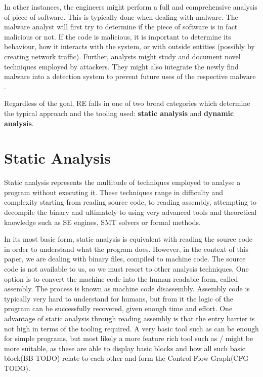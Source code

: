 In other instances, the engineers might perform a full and comprehensive analysis of piece of software. This is typically done when dealing with malware. The malware analyst will first try to determine if the piece of software is in fact malicious or not. If the code is malicious, it is important to determine its behaviour, how it interacts with the system, or with outside entities (possibly by creating network traffic). Further, analysts might study and document novel techniques employed by attackers. They might also integrate the newly find malware into a detection system to prevent future uses of the respective malware \cite{malware_crowdstrike}.

Regardless of the goal, RE falls in one of two broad categories which determine the typical approach and the tooling used: \textbf{static analysis} and \textbf{dynamic analysis}.

\section{Static Analysis}

Static analysis represents the multitude of techniques employed to analyse a program without executing it. These techniques range in difficulty and complexity starting from reading source code, to reading assembly, attempting to decompile the binary and ultimately to using very advanced tools and theoretical knowledge such as \gls{SE} engines, SMT solvers or formal methods. %

In its most basic form, static analysis is equivalent with reading the source code in order to understand what the program does. However, in the context of this paper, we are dealing with binary files, compiled to machine code. The source code is not available to us, so we must resort to other analysis techniques. One option is to convert the machine code into the human readable form, called assembly. The process is known as machine code disassembly. Assembly code is typically very hard to understand for humans, but from it the logic of the program can be successfully recovered, given enough time and effort. One advantage of static analysis through reading assembly is that the entry barrier is not high in terms of the tooling required. A very basic tool such as  \cite{TODO} can be enough for simple programs, but most likely a more feature rich tool such as / \cite{TODO} might be more suitable, as these are able to display basic blocks and how all such basic block(BB TODO) relate to each other and form the Control Flow Graph(CFG TODO).

